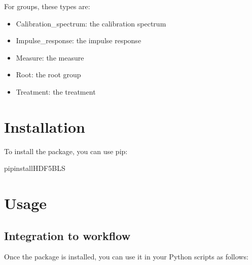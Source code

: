 \documentclass[letterpaper,10pt,english]{sphinxmanual}
\begin{document}
\sphinxAtStartPar
For groups, these types are:
\begin{itemize}
\item {} 
\sphinxAtStartPar
Calibration\_spectrum: the calibration spectrum

\item {} 
\sphinxAtStartPar
Impulse\_response: the impulse response

\item {} 
\sphinxAtStartPar
Measure: the measure

\item {} 
\sphinxAtStartPar
Root: the root group

\item {} 
\sphinxAtStartPar
Treatment: the treatment

\end{itemize}


\section{Installation}
\label{\detokenize{index:installation}}
\sphinxAtStartPar
To install the package, you can use pip:

\begin{sphinxVerbatim}[commandchars=\\\{\}]
pipinstallHDF5\PYGZus{}BLS
\end{sphinxVerbatim}


\section{Usage}
\label{\detokenize{index:usage}}

\subsection{Integration to workflow}
\label{\detokenize{index:integration-to-workflow}}
\sphinxAtStartPar
Once the package is installed, you can use it in your Python scripts as follows:
\end{document}
